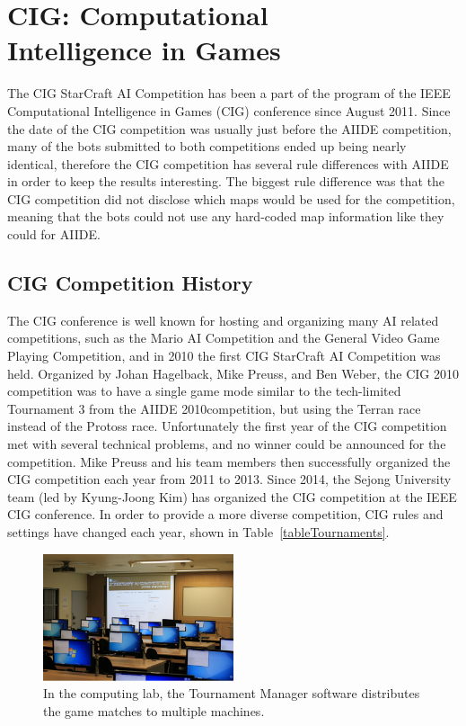 \section{CIG: Computational\\ Intelligence in Games}\label{subsecCIG}

The CIG StarCraft AI Competition has been a part of the program of the IEEE Computational Intelligence in Games (CIG) conference since August 2011.  Since the date of the CIG competition was usually just before the AIIDE competition, many of the bots submitted to both competitions ended up being nearly identical, therefore the CIG competition has several rule differences with AIIDE in order to keep the results interesting. The biggest rule difference was that the CIG competition did not disclose which maps would be used for the competition, meaning that the bots could not use any hard-coded map information like they could for AIIDE.

\subsection{CIG Competition History}
The CIG conference is well known for hosting and organizing many AI related competitions, such as the Mario AI Competition and the General Video Game Playing Competition, and in 2010 the first CIG StarCraft AI Competition was held. Organized by Johan Hagelback, Mike Preuss, and Ben Weber, the CIG 2010 competition was to have a single game mode similar to the tech-limited Tournament 3 from the AIIDE 2010competition, but using the Terran race instead of the Protoss race. Unfortunately the first year of the CIG competition met with several technical problems, and no winner could be announced for the competition. Mike Preuss and his team members then successfully organized the CIG competition each year from 2011 to 2013. Since 2014, the Sejong University team (led by Kyung-Joong Kim) has organized the CIG  competition at the IEEE CIG conference. In order to provide a more diverse competition, CIG rules and settings have changed each year, shown in Table~\ref{tableTournaments}. 

\begin{figure}[t]
  \centering
  \includegraphics[width=0.5\textwidth]{fig/cig-starcraft-runs.png}
  \caption{In the computing lab, the Tournament Manager software distributes the game matches to multiple machines.}
  \label{figCIGruns}
\end{figure}


